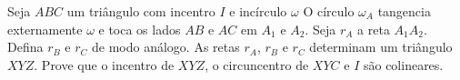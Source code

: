 Seja $ABC$ um triângulo com incentro $I$ e incírculo $\omega$
O círculo $\omega_A$ tangencia externamente $\omega$ e toca os lados $AB$ e $AC$ em $A_1$ e $A_2$.
Seja $r_A$ a reta $A_1A_2$.
Defina $r_B$ e $r_C$ de modo análogo.
As retas $r_A$, $r_B$ e $r_C$ determinam um triângulo $XYZ$.
Prove que o incentro de $XYZ$, o circuncentro de $XYC$ e $I$ são colineares.